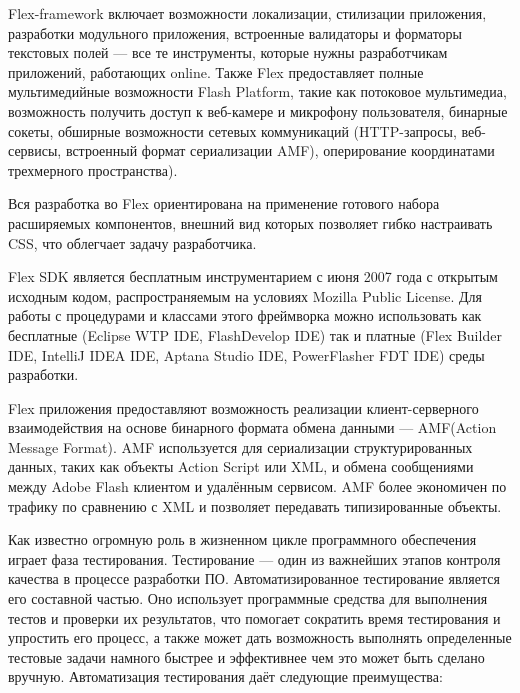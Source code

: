 Flex-framework включает возможности локализации, стилизации приложения, разработки модульного приложения, 
встроенные валидаторы и форматоры текстовых полей --- все те инструменты, которые нужны разработчикам
приложений, работающих online. Также Flex предоставляет полные мультимедийные возможности Flash 
Platform, такие как потоковое мультимедиа, возможность получить доступ к веб-камере и микрофону
пользователя, бинарные сокеты, обширные возможности сетевых коммуникаций (HTTP-запросы, веб-сервисы, 
встроенный формат сериализации AMF), оперирование координатами трехмерного пространства).

Вся разработка во Flex ориентирована на применение готового набора расширяемых компонентов,
внешний вид которых позволяет гибко настраивать CSS, что облегчает задачу разработчика.

Flex SDK является бесплатным инструментарием с июня 2007 года с открытым исходным кодом,
распространяемым на условиях Mozilla Public License. Для работы с процедурами и классами этого фреймворка
можно использовать как бесплатные (Eclipse WTP IDE, FlashDevelop IDE) так и платные
(Flex Builder IDE, IntelliJ IDEA IDE, Aptana Studio IDE, PowerFlasher FDT IDE) среды разработки.

Flex приложения предоставляют возможность реализации клиент-серверного взаимодействия 
на основе бинарного формата обмена данными --- AMF(Action Message Format). AMF
используется для сериализации структурированных данных, таких как объекты Action Script 
или XML, и обмена сообщениями между Adobe Flash клиентом и удалённым сервисом. 
AMF более экономичен по трафику по сравнению с XML и позволяет передавать типизированные объекты.

Как известно огромную роль в жизненном цикле программного обеспечения играет фаза тестирования.
Тестирование — один из важнейших этапов контроля качества в процессе разработки ПО.
Автоматизированное тестирование является его составной частью. Оно использует программные средства для
выполнения тестов и проверки их результатов, что помогает сократить
время тестирования и упростить его процесс, а также может 
дать возможность выполнять определенные тестовые задачи намного быстрее и 
эффективнее чем это может быть сделано вручную. Автоматизация тестирования 
даёт следующие преимущества\cite{dot-com}:

